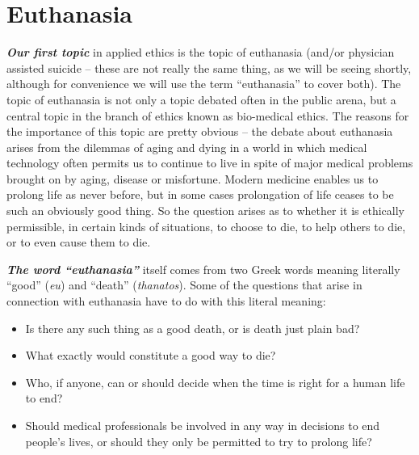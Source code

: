 \documentclass[
  12pt, openany]{book}
\makeatletter
\providecommand{\tightlist}{%
  \setlength{\itemsep}{0pt}\setlength{\parskip}{0pt}}
\newenvironment{kframe}{%
\medskip{}
\setlength{\fboxsep}{.8em}
 \def\at@end@of@kframe{}%
 \ifinner\ifhmode%
  \def\at@end@of@kframe{\end{minipage}}%
  \begin{minipage}{\columnwidth}%
 \fi\fi%
 \def\FrameCommand##1{\hskip\@totalleftmargin \hskip-\fboxsep
 \colorbox{shadecolor}{##1}\hskip-\fboxsep
     \hskip-\linewidth \hskip-\@totalleftmargin \hskip\columnwidth}%
 \MakeFramed {\advance\hsize-\width
   \@totalleftmargin\z@ \linewidth\hsize
   \@setminipage}}%
 {\par\unskip\endMakeFramed%
 \at@end@of@kframe}
\newenvironment{rmdblock}[1]
  {
  \begin{itemize}
  \renewcommand{\labelitemi}{
    \raisebox{-.7\height}[0pt][0pt]{
      {\setkeys{Gin}{width=3em,keepaspectratio}\texttt{[image: img/\#1]}}
    }
  }
  \setlength{\fboxsep}{1em}
  \begin{kframe}
  \item
  }
  {
  \end{kframe}
  \end{itemize}
  }
\newenvironment{question}
  {\begin{rmdblock}{question}}
  {\end{rmdblock}}
\theoremstyle{definition}
\theoremstyle{definition}
\theoremstyle{definition}
\theoremstyle{remark}
\makeatother
\begin{document}
\hypertarget{euthanasia}{%
\chapter{Euthanasia}\label{euthanasia}}

\textbf{\emph{Our first topic}} in applied ethics is the topic of euthanasia (and/or physician assisted suicide -- these are not really the same thing, as we will be seeing shortly, although for convenience we will use the term ``euthanasia'' to cover both). The topic of euthanasia is not only a topic debated often in the public arena, but a central topic in the branch of ethics known as bio-medical ethics. The reasons for the importance of this topic are pretty obvious -- the debate about euthanasia arises from the dilemmas of aging and dying in a world in which medical technology often permits us to continue to live in spite of major medical problems brought on by aging, disease or misfortune. Modern medicine enables us to prolong life as never before, but in some cases prolongation of life ceases to be such an obviously good thing. So the question arises as to whether it is ethically permissible, in certain kinds of situations, to choose to die, to help others to die, or to even cause them to die.

\textbf{\emph{The word ``euthanasia''}} itself comes from two Greek words meaning literally ``good'' (\emph{eu}) and ``death'' (\emph{thanatos}). Some of the questions that arise in connection with euthanasia have to do with this literal meaning:

\begin{question}

\begin{itemize}
\tightlist
\item
  Is there any such thing as a good death, or is death just plain bad?
\item
  What exactly would constitute a good way to die?
\item
  Who, if anyone, can or should decide when the time is right for a human life to end?
\item
  Should medical professionals be involved in any way in decisions to end people's lives, or should they only be permitted to try to prolong life?
\end{itemize}

\end{question}
\end{document}
